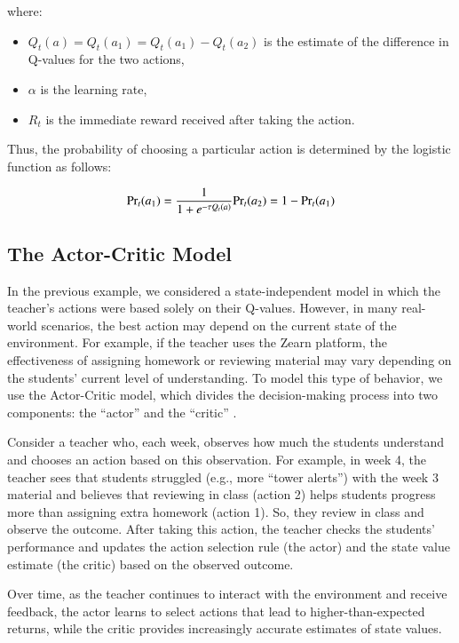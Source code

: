 \documentclass[
  number,
  preprint,
  3p,
  onecolumn]{elsarticle}
\begin{document}
where:

\begin{itemize}
\item
  \(Q_{t}(a)=Q_{t}(a_1)=Q_{t}(a_1)-Q_{t}(a_2)\) is the estimate of the
  difference in Q-values for the two actions,
\item
  \(\alpha\) is the learning rate,
\item
  \(R_t\) is the immediate reward received after taking the action.
\end{itemize}

Thus, the probability of choosing a particular action is determined by
the logistic function as follows:

\[
\text{Pr}_t(a_1) = \frac{1}{1+e^{-\tau Q_{t}(a)}}
\\
\text{Pr}_t(a_2) = 1 - \text{Pr}_t(a_1)
\]

\subsection{The Actor-Critic Model}\label{the-actor-critic-model}

In the previous example, we considered a state-independent model in
which the teacher's actions were based solely on their Q-values.
However, in many real-world scenarios, the best action may depend on the
current state of the environment. For example, if the teacher uses the
Zearn platform, the effectiveness of assigning homework or reviewing
material may vary depending on the students' current level of
understanding. To model this type of behavior, we use the Actor-Critic
model, which divides the decision-making process into two components:
the ``actor'' and the ``critic'' \citep{sutton2018b}.

Consider a teacher who, each week, observes how much the students
understand and chooses an action based on this observation. For example,
in week 4, the teacher sees that students struggled (e.g., more ``tower
alerts'') with the week 3 material and believes that reviewing in class
(action 2) helps students progress more than assigning extra homework
(action 1). So, they review in class and observe the outcome. After
taking this action, the teacher checks the students' performance and
updates the action selection rule (the actor) and the state value
estimate (the critic) based on the observed outcome.

Over time, as the teacher continues to interact with the environment and
receive feedback, the actor learns to select actions that lead to
higher-than-expected returns, while the critic provides increasingly
accurate estimates of state values.
\end{document}
